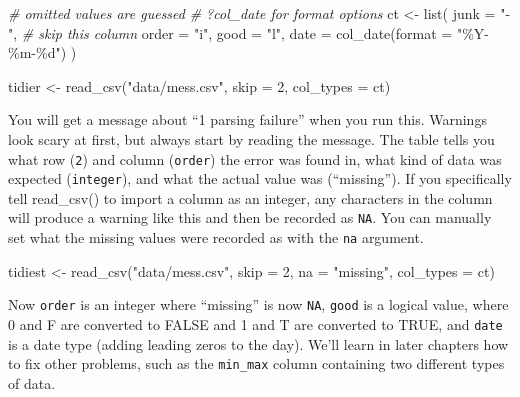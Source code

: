\documentclass[
  oneside]{book}
\newenvironment{Shaded}{\begin{snugshade}}{\end{snugshade}}
\newcommand{\AttributeTok}[1]{\textcolor[rgb]{0.77,0.63,0.00}{#1}}
\newcommand{\CommentTok}[1]{\textcolor[rgb]{0.56,0.35,0.01}{\textit{#1}}}
\newcommand{\DecValTok}[1]{\textcolor[rgb]{0.00,0.00,0.81}{#1}}
\newcommand{\FunctionTok}[1]{\textcolor[rgb]{0.00,0.00,0.00}{#1}}
\newcommand{\NormalTok}[1]{#1}
\newcommand{\OtherTok}[1]{\textcolor[rgb]{0.56,0.35,0.01}{#1}}
\newcommand{\StringTok}[1]{\textcolor[rgb]{0.31,0.60,0.02}{#1}}
\begin{document}
\begin{Shaded}
\begin{Highlighting}[]
\CommentTok{\# omitted values are guessed}
\CommentTok{\# ?col\_date for format options}
\NormalTok{ct }\OtherTok{\textless{}{-}} \FunctionTok{list}\NormalTok{(}
  \AttributeTok{junk =} \StringTok{"{-}"}\NormalTok{, }\CommentTok{\# skip this column}
  \AttributeTok{order =} \StringTok{"i"}\NormalTok{,}
  \AttributeTok{good =} \StringTok{"l"}\NormalTok{,}
  \AttributeTok{date =} \FunctionTok{col\_date}\NormalTok{(}\AttributeTok{format =} \StringTok{"\%Y{-}\%m{-}\%d"}\NormalTok{)}
\NormalTok{)}

\NormalTok{tidier }\OtherTok{\textless{}{-}} \FunctionTok{read\_csv}\NormalTok{(}\StringTok{"data/mess.csv"}\NormalTok{, }
                   \AttributeTok{skip =} \DecValTok{2}\NormalTok{,}
                   \AttributeTok{col\_types =}\NormalTok{ ct)}
\end{Highlighting}
\end{Shaded}

You will get a message about ``1 parsing failure'' when you run this. Warnings look scary at first, but always start by reading the message. The table tells you what row (\texttt{2}) and column (\texttt{order}) the error was found in, what kind of data was expected (\texttt{integer}), and what the actual value was ({``missing''}). If you specifically tell {read\_csv}{(}{)} to import a column as an integer, any characters in the column will produce a warning like this and then be recorded as \texttt{NA}. You can manually set what the missing values were recorded as with the \texttt{na} argument.

\begin{Shaded}
\begin{Highlighting}[]
\NormalTok{tidiest }\OtherTok{\textless{}{-}} \FunctionTok{read\_csv}\NormalTok{(}\StringTok{"data/mess.csv"}\NormalTok{, }
                   \AttributeTok{skip =} \DecValTok{2}\NormalTok{,}
                   \AttributeTok{na =} \StringTok{"missing"}\NormalTok{,}
                   \AttributeTok{col\_types =}\NormalTok{ ct)}
\end{Highlighting}
\end{Shaded}

Now \texttt{order} is an integer where ``missing'' is now \texttt{NA}, \texttt{good} is a logical value, where {0} and {F} are converted to {FALSE} and {1} and {T} are converted to {TRUE}, and \texttt{date} is a date type (adding leading zeros to the day). We'll learn in later chapters how to fix other problems, such as the \texttt{min\_max} column containing two different types of data.
\end{document}
